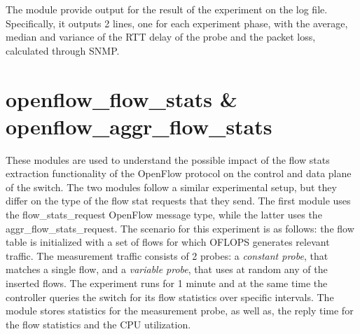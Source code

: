 \documentclass{book}
\begin{document}
  The module provide output for the result of the experiment on the log file. 
  Specifically, it outputs 2 lines, one for each experiment phase, with the average, median 
  and variance of the RTT delay of the probe and the packet
  loss, calculated through SNMP. 

  \section{openflow\_flow\_stats \& openflow\_aggr\_flow\_stats}

  These modules are used to understand the possible impact of the flow stats
  extraction functionality of the OpenFlow protocol on the control and data plane of the
  switch. The two modules follow a similar experimental setup, but they differ on
  the type of the flow stat requests that they send. The first module uses the
  flow\_stats\_request OpenFlow message type, while the latter uses the
  aggr\_flow\_stats\_request. 
  The scenario for this experiment is as follows: the flow table is
  initialized with a set of flows for which OFLOPS generates relevant traffic. 
  The measurement traffic consists of 2 probes: a \emph{constant probe}, that
  matches a single flow, and a \emph{variable probe}, that uses at
  random any of the inserted flows. The experiment runs for 1 minute and at 
  the same time the controller queries the switch for its flow statistics over 
  specific intervals. The module stores statistics for the measurement probe, as
  well as, the reply time for the flow statistics and the CPU utilization. 
\end{document}
